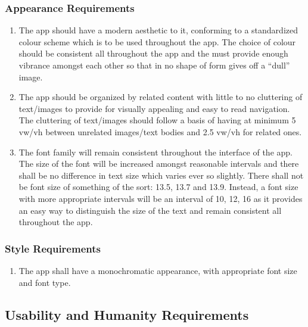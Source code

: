 \documentclass[]{article}
\begin{document}
\subsubsection{Appearance Requirements}
\label{ssub:appearance_requirements}
\begin{enumerate}[{LF-A}1. ]
	\item The app should have a modern aesthetic to it, conforming to a standardized colour scheme which is to be used throughout the app. The choice of colour should be consistent all throughout the app and the must provide enough vibrance amongst each other so that in no shape of form gives off a “dull” image.
	\item The app should be organized by related content with little to no cluttering of text/images to provide for visually appealing and easy to read navigation. The cluttering of text/images should follow a basis of having at minimum 5 vw/vh between unrelated images/text bodies and 2.5 vw/vh for related ones.
	\item The font family will remain consistent throughout the interface of the app. The size of the font will be increased amongst reasonable intervals and there shall be no difference in text size which varies ever so slightly.  There shall not be font size of something of the sort: 13.5, 13.7 and 13.9. Instead, a font size with more appropriate intervals will be an interval of 10, 12, 16 as it provides an easy way to distinguish the size of the text and remain consistent all throughout the app.
\end{enumerate}

\subsubsection{Style Requirements}
\label{ssub:style_requirements}
\begin{enumerate}[{LF-S}1. ]
	\item The app shall have a monochromatic appearance, with appropriate font size and font type.
\end{enumerate}


\subsection{Usability and Humanity Requirements}
\label{sub:usability_and_humanity_requirements}
\end{document}
